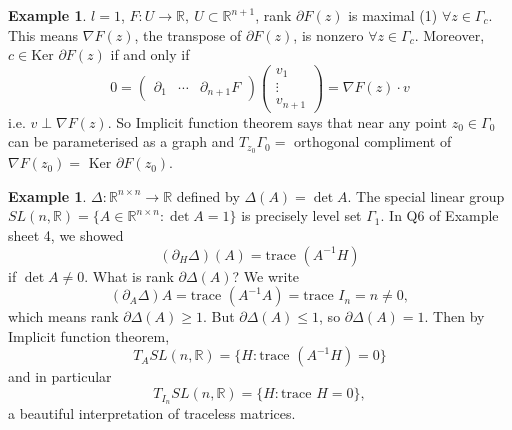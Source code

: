 \documentclass[a4paper]{article}
\theoremstyle{definition}
\newtheorem{eg}[defn]{Example}
\begin{document}
\begin{eg}
$l=1$, $F:U\rightarrow \mathbb R,\ U\subset \mathbb R^{n+1}$, rank $\partial F(z)$ is maximal (1) $\forall z\in \Gamma_c$. This means $\nabla F(z)$, the transpose of $\partial F(z)$, is nonzero $\forall z \in \Gamma_c$. Moreover, $c\in \text{Ker }\partial F(z)$ if and only if
\[
0=\begin{pmatrix}
    \partial_1 & \cdots & \partial_{n+1} F
\end{pmatrix} \begin{pmatrix}
    v_1 \\ \vdots \\ v_{n+1}
\end{pmatrix} = \nabla F(z) \cdot v
\]
i.e. $v \perp \nabla F(z)$. So Implicit function theorem says that near any point $z_0 \in \Gamma_0$ can be parameterised as a graph and $T_{z_0} \Gamma_0 = $ orthogonal compliment of $\nabla F(z_0) =$ Ker $\partial F(z_0)$.
\end{eg}

\begin{eg}
$\Delta: \mathbb R^{n\times n} \rightarrow \mathbb R$ defined by $\Delta(A) = \det A$. The special linear group $SL(n,\mathbb R) = \{A\in \mathbb R^{n\times n} : \det A=1\}$ is precisely level set $\Gamma_1$. In Q6 of Example sheet 4, we showed
\[
(\partial _H \Delta) (A) = \text{trace } (A^{-1}H)
\]
if $\det A \neq 0$. What is rank $\partial \Delta (A)$? We write
\[
(\partial_A \Delta)A = \text{trace } (A^{-1}A) = \text{trace }I_n = n \neq 0,
\]
which means rank $\partial \Delta (A) \geq 1$. But $\partial \Delta (A) \leq 1$, so $\partial \Delta (A) = 1$. Then by Implicit function theorem,
\[
T_A SL(n,\mathbb R) = \{H:\text{trace } (A^{-1} H) = 0\}
\]
and in particular
\[
T_{I_n} SL (n,\mathbb R) = \{H:\text{trace }H=0\},
\]
a beautiful interpretation of traceless matrices.
\end{eg}
\end{document}

